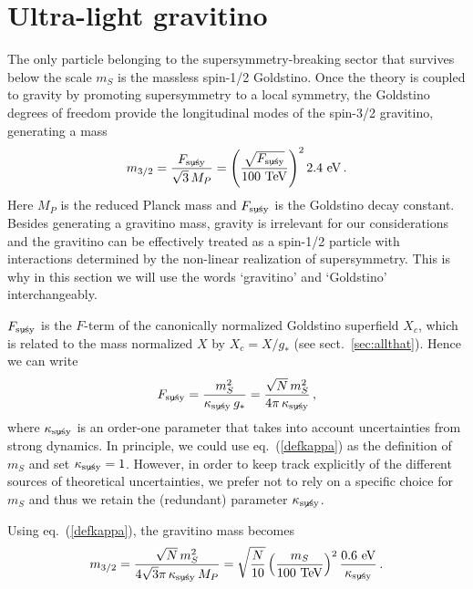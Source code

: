 \documentclass[a4paper,12pt]{article}
\newcommand{\beq}{\begin{equation}}
\newcommand{\eeq}{\end{equation}}
\def\eq#1{eq.~(\ref{#1})}
\def\eq#1{eq.~(\ref{#1})}
\def\sec#1{sect.~\ref{#1}}
\def\mS{m_S}
\def\Fs{F_ {{\rm susy}\! \! \! \! \! \! \! \!\diagup \,\,\,}}
\def\Ks{\kappa_ {{\rm susy}\! \! \! \! \! \! \! \!\diagup \,\,\,}}
\def\mgra{m_{3/2}}
\begin{document}
{{{{\boldmath
\section{Ultra-light gravitino}
\unboldmath
\label{sec:cosmo}

The only particle belonging to the supersymmetry-breaking sector that survives below the scale $\mS$ is the massless spin-1/2 Goldstino. Once the theory is coupled to gravity by promoting supersymmetry to a local symmetry, the Goldstino degrees of freedom provide the longitudinal modes of the spin-3/2 gravitino, generating a mass
\beq
\mgra = \frac{\Fs}{\sqrt{3} \, M_P} = 
 \left( \frac{\sqrt{\Fs}}{100~{\rm TeV}}\right)^2 2.4~{\rm eV}\, .
\eeq
Here $M_P$ is the reduced Planck mass and $\Fs$ is the Goldstino decay constant. Besides generating a gravitino mass, gravity is irrelevant for our considerations and the gravitino can be effectively treated as a spin-1/2 particle with interactions determined by the non-linear realization of supersymmetry. This is why in this section we will use the words `gravitino' and `Goldstino' interchangeably.

$\Fs$ is the $F$-term of the canonically normalized Goldstino superfield $X_c$, which is related to the mass normalized $X$ by $X_c=X/g_*$ (see \sec{sec:allthat}). Hence we can write
\beq
\Fs = \frac{\mS^2}{\Ks\, g_*}=\frac{ \sqrt{N}\, \mS^2}{4\pi\,\Ks} \, ,
\label{defkappa}
\eeq
where $\Ks$ is an order-one parameter that takes into account uncertainties from strong dynamics. In principle, we could use \eq{defkappa} as the definition of $\mS$ and set $\Ks =1$. However, in order to keep track explicitly of the different sources of theoretical uncertainties, we prefer not to rely on a specific choice for $\mS$ and thus we retain the (redundant) parameter $\Ks$.

Using \eq{defkappa}, the gravitino mass becomes
\beq
\mgra = \frac{ \sqrt{N}\, \mS^2}{4\sqrt{3}\pi\, \Ks\,M_P} =
\sqrt{\frac{N}{10}} \left( \frac{\mS}{100~{\rm TeV}}\right)^2 \frac{0.6~{\rm eV}}{\Ks}\, .
\label{grame}
\eeq

}}}}
\end{document}

